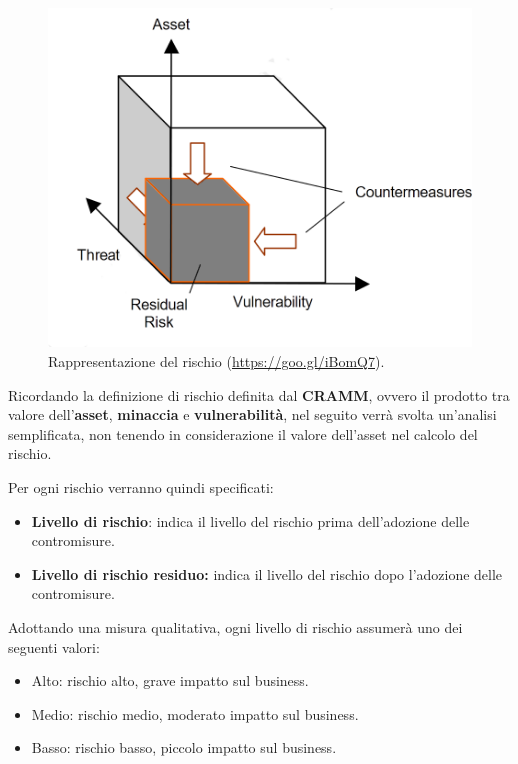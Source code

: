                 \begin{figure}[H]
				\centering
				\includegraphics[scale=0.3]{immagini/rollout/risk}
				\caption{Rappresentazione del rischio (\url{https://goo.gl/iBomQ7}).}
			\end{figure}
                
                Ricordando la definizione di rischio definita dal \textbf{CRAMM}, ovvero il prodotto tra valore dell'\textbf{asset}, \textbf{minaccia} e \textbf{vulnerabilità}, nel seguito verrà svolta un'analisi semplificata, non tenendo in considerazione il valore dell'asset nel calcolo del rischio.
                
                
                Per ogni rischio verranno quindi specificati: 
                \begin{itemize}
                	\item \textbf{Livello di rischio}: indica il livello del rischio prima dell'adozione delle contromisure.
                    \item \textbf{Livello di rischio residuo:} indica il livello del rischio dopo l'adozione delle contromisure.
                \end{itemize}
                
                
                Adottando una misura qualitativa, ogni livello di rischio assumerà uno dei seguenti valori:
                \begin{itemize}
                	\item Alto: rischio alto, grave impatto sul business.
                    \item Medio: rischio medio, moderato impatto sul business.
                    \item Basso: rischio basso, piccolo impatto sul business.
                \end{itemize}
                
